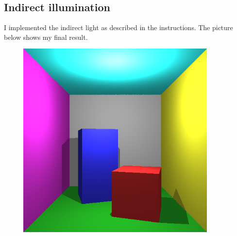 \subsection{Indirect illumination}
I implemented the indirect light as described in the instructions. The picture below shows my final result.
\begin{figure}[ht]
    \centering
    \includegraphics[width=10cm]{screenshots/indirect_illumination.png}
\end{figure}
